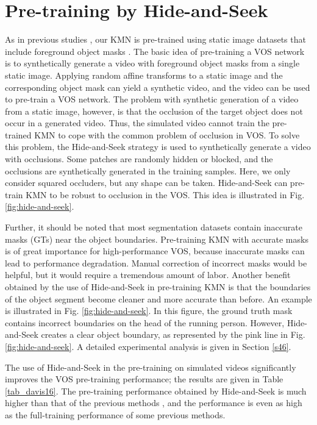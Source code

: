 \documentclass[runningheads]{llncs}
\begin{document}
\section{Pre-training by Hide-and-Seek}
\label{s33}
As in previous studies \cite{perazzi2017learning,wug2018fast,Oh_2019_ICCV}, our KMN is pre-trained using static image datasets that include foreground object masks \cite{b42,b43,hariharan2011semantic,shi2015hierarchical,cheng2014global,wang2017salient}. The basic idea of pre-training a VOS network is to synthetically generate a video with foreground object masks from a single static image. Applying random affine transforms to a static image and the corresponding object mask can yield a synthetic video, and the video can be used to pre-train a VOS network. The problem with synthetic generation of a video from a static image, however, is that the occlusion of the target object does not occur in a generated video. Thus, the simulated video cannot train the pre-trained KMN to cope with the common problem of occlusion in VOS. To solve this problem, the Hide-and-Seek strategy is used to synthetically generate a video with occlusions. Some patches are randomly hidden or blocked, and the occlusions are synthetically generated in the training samples. Here, we only consider squared occluders, but any shape can be taken. Hide-and-Seek can pre-train KMN to be robust to occlusion in the VOS. This idea is illustrated in Fig. \ref{fig:hide-and-seek}.

Further, it should be noted that most segmentation datasets contain inaccurate masks (GTs) near the object boundaries. Pre-training KMN with accurate masks is of great importance for high-performance VOS, because inaccurate masks can lead to performance degradation. Manual correction of incorrect masks would be helpful, but it would require a tremendous amount of labor. Another benefit obtained by the use of Hide-and-Seek in pre-training KMN is that the boundaries of the object segment become cleaner and more accurate than before. An example is illustrated in Fig. \ref{fig:hide-and-seek}. In this figure, the ground truth mask contains incorrect boundaries on the head of the running person. However, Hide-and-Seek creates a clear object boundary, as represented by the pink line in Fig. \ref{fig:hide-and-seek}. A detailed experimental analysis is given in Section \ref{s46}.

The use of Hide-and-Seek in the pre-training on simulated videos significantly improves the VOS pre-training performance; the results are given in Table \ref{tab_davis16}. The pre-training performance obtained by Hide-and-Seek is much higher than that of the previous methods \cite{wug2018fast,Oh_2019_ICCV}, and the performance is even as high as the full-training performance of some previous methods.
\end{document}
